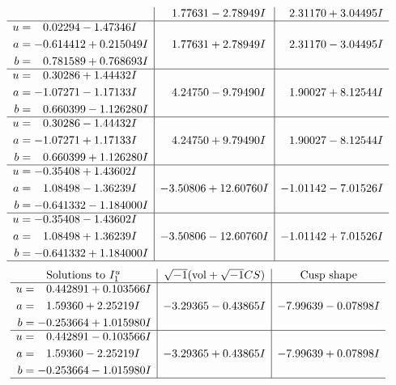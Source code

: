 \documentclass[1p]{elsarticle_modified}
\theoremstyle{definition}
\newcommand{\I}{\sqrt{-1}}
\begin{document}
$$\begin{array}{c|c|c}
 & \phantom{-}1.77631 - 2.78949 I & \phantom{-}2.31170 + 3.04495 I \\ \hline\begin{aligned}
u &= \phantom{-}0.02294 - 1.47346 I \\
a &= -0.614412 + 0.215049 I \\
b &= \phantom{-}0.781589 + 0.768693 I\end{aligned}
 & \phantom{-}1.77631 + 2.78949 I & \phantom{-}2.31170 - 3.04495 I \\ \hline\begin{aligned}
u &= \phantom{-}0.30286 + 1.44432 I \\
a &= -1.07271 - 1.17133 I \\
b &= \phantom{-}0.660399 - 1.126280 I\end{aligned}
 & \phantom{-}4.24750 - 9.79490 I & \phantom{-}1.90027 + 8.12544 I \\ \hline\begin{aligned}
u &= \phantom{-}0.30286 - 1.44432 I \\
a &= -1.07271 + 1.17133 I \\
b &= \phantom{-}0.660399 + 1.126280 I\end{aligned}
 & \phantom{-}4.24750 + 9.79490 I & \phantom{-}1.90027 - 8.12544 I \\ \hline\begin{aligned}
u &= -0.35408 + 1.43602 I \\
a &= \phantom{-}1.08498 - 1.36239 I \\
b &= -0.641332 - 1.184000 I\end{aligned}
 & -3.50806 + 12.60760 I & -1.01142 - 7.01526 I \\ \hline\begin{aligned}
u &= -0.35408 - 1.43602 I \\
a &= \phantom{-}1.08498 + 1.36239 I \\
b &= -0.641332 + 1.184000 I\end{aligned}
 & -3.50806 - 12.60760 I & -1.01142 + 7.01526 I\\
 \hline 
 \end{array}$$\newpage$$\begin{array}{c|c|c}  
\text{Solutions to }I^u_{1}& \I (\text{vol} + \sqrt{-1}CS) & \text{Cusp shape}\\
 \hline 
\begin{aligned}
u &= \phantom{-}0.442891 + 0.103566 I \\
a &= \phantom{-}1.59360 + 2.25219 I \\
b &= -0.253664 + 1.015980 I\end{aligned}
 & -3.29365 - 0.43865 I & -7.99639 - 0.07898 I \\ \hline\begin{aligned}
u &= \phantom{-}0.442891 - 0.103566 I \\
a &= \phantom{-}1.59360 - 2.25219 I \\
b &= -0.253664 - 1.015980 I\end{aligned}
 & -3.29365 + 0.43865 I & -7.99639 + 0.07898 I\\
 \hline 
 \end{array}$$\newpage\newpage\renewcommand{\arraystretch}{1}
\end{document}
